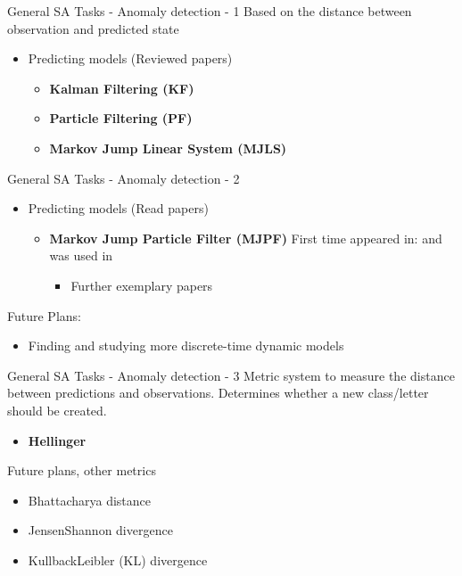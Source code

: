 \documentclass[unknownkeysallowed]{beamer}
\begin{document}
\begin{frame}{General SA Tasks - Anomaly detection - 1}
	Based on the distance between observation and predicted state
	\begin{itemize}
		\item Predicting models (Reviewed papers)
			\begin{itemize}
				\item \textbf{Kalman Filtering (KF)} 
				\item \textbf{Particle Filtering (PF)} 
				\item \textbf{Markov Jump Linear System (MJLS)} 
			\end{itemize}
	\end{itemize}
\end{frame}

\begin{frame}{General SA Tasks - Anomaly detection - 2}
	\begin{itemize}
		\item Predicting models (Read papers)
		\begin{itemize}
			\item \textbf{Markov Jump Particle Filter (MJPF)} First time appeared in:  and was used in 
			\begin{itemize}
				\item Further exemplary papers 
			\end{itemize}
		\end{itemize}
	\end{itemize}
	Future Plans:
	\begin{itemize}
		\item Finding and studying more discrete-time dynamic models
	\end{itemize}
\end{frame}

\begin{frame}{General SA Tasks - Anomaly detection - 3}
	Metric system to measure the distance between predictions and observations. Determines whether a new class/letter should be created. 
	\begin{itemize}
		\item \textbf{Hellinger} 
	\end{itemize}
	Future plans, other metrics
	\begin{itemize}
		\item Bhattacharya distance
		\item JensenShannon divergence 
		\item KullbackLeibler (KL) divergence 
	\end{itemize}
\end{frame}
\end{document}
